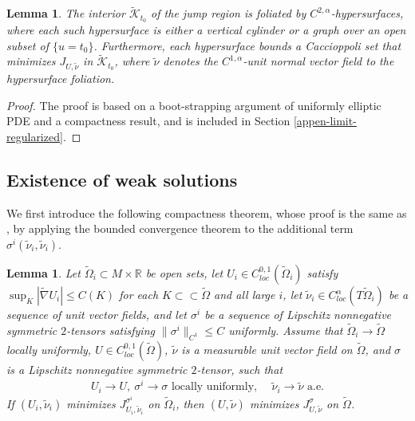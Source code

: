 \documentclass[11pt, letterpaper]{amsart}
\newtheorem{lem}[thm]{Lemma}
\theoremstyle{definition}
\theoremstyle{remark}
\begin{document}
\begin{lem}\label{lem-foliation-jump}
	The interior $\tilde{\mathcal{K}}_{t_0}$ of the jump region is foliated by $C^{2,\alpha }$-hypersurfaces, where each such hypersurface is either a vertical cylinder or a graph over an open subset of $\{u=t_0\} $. Furthermore, each hypersurface bounds a Caccioppoli set that minimizes $J_{U, \tilde{\nu }}$ in $\tilde{\mathcal{K}}_{t_0}$, where $\tilde{\nu }$ denotes the $C^{1,\alpha }$-unit normal vector field to the hypersurface foliation.
\end{lem}
\begin{proof}
	The proof is based on a boot-strapping argument of uniformly elliptic PDE and a compactness result, and is included in Section \ref{appen-limit-regularized}.
\end{proof}




\subsection{Existence of weak solutions}
We first introduce the following compactness theorem, whose proof is the same as \cite[Theorem 2.1]{HI01}, by applying the bounded convergence theorem to the additional term $\sigma ^{i}(\tilde{\nu }_i, \tilde{\nu }_i)$. 

\begin{lem}\label{lemma-compactness}
	Let $\tilde{\Omega }_i \subset M \times \mathbb{R}$ be open sets, let $U_i \in C^{0,1}_{loc}(\tilde{\Omega }_i)$ satisfy $\sup_{K}|\tilde{\nabla }U_i| \leq C(K)$ for each $K \subset \subset \tilde{\Omega }$ and all large $i$, let $\tilde{\nu }_i \in C^{\alpha }_{loc}(T \tilde{\Omega }_i)$ be a sequence of unit vector fields, and let $\sigma ^{i}$ be a sequence of Lipschitz nonnegative symmetric $2$-tensors satisfying $\|\sigma ^{i}\|_{C^1} \leq C$ uniformly. Assume that $\tilde{\Omega }_i \to \tilde{\Omega }$ locally uniformly, $U \in C^{0,1}_{loc}(\tilde{\Omega })$, $\tilde{\nu }$ is a measurable unit vector field on $\tilde{\Omega }$, and $\sigma $ is a Lipschitz nonnegative symmetric $2$-tensor, such that 
\begin{align*}
	U_i \to U, \ \sigma ^{i} \to \sigma \text{ locally uniformly, }\quad  \tilde{\nu }_i \to \tilde{\nu } \text{ a.e.}
\end{align*} 
If $(U_i, \tilde{\nu }_i)$ minimizes $J^{\sigma ^{i}}_{U_i, \tilde{\nu }_i}$ on $\tilde{\Omega }_i$, then $(U, \tilde{\nu })$ minimizes $J^{\sigma }_{U, \tilde{\nu }}$ on $\tilde{\Omega }$.
\end{lem}
\end{document}
